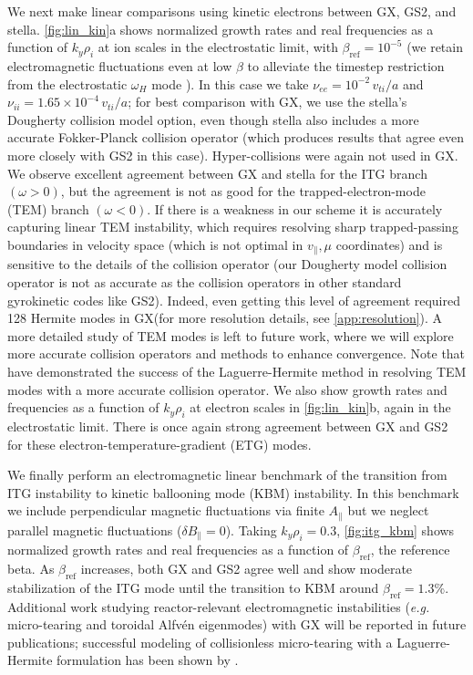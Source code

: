 \documentclass{jpp}
\newcommand{\GX}{{GX}\xspace}
\begin{document}
We next make linear comparisons using kinetic electrons between \GX, GS2, and stella. \cref{fig:lin_kin}a shows normalized growth rates and real frequencies as a function of $k_y \rho_i$ at ion scales in the electrostatic limit, with $\beta_\mathrm{ref}=10^{-5}$ (we retain electromagnetic fluctuations even at low $\beta$ to alleviate the timestep restriction from the electrostatic $\omega_H$ mode \citep{lee1987}). 
In this case we take $\nu_{ee} = 10^{-2}  \, v_{ti}/a$ and $\nu_{ii} = 1.65\times 10^{-4} \, v_{ti}/a$; for best comparison with \GX, we use the stella's Dougherty collision model option, even though stella also includes a more accurate Fokker-Planck collision operator (which produces results that agree even more closely with GS2 in this case). Hyper-collisions were again not used in \GX. We observe excellent agreement between \GX and stella for the ITG branch $(\omega>0)$, but the agreement is not as good for the trapped-electron-mode (TEM) branch $(\omega<0)$. If there is a weakness in our scheme it is accurately capturing linear TEM instability, which requires resolving sharp trapped-passing boundaries in velocity space (which is not optimal in $v_\parallel,\mu$ coordinates) and is sensitive to the details of the collision operator (our Dougherty model collision operator is not as accurate as the collision operators in other standard gyrokinetic codes like GS2). Indeed, even getting this level of agreement required 128 Hermite modes in \GX (for more resolution details, see \cref{app:resolution}). A more detailed study of TEM modes is left to future work, where we will explore more accurate collision operators and methods to enhance convergence. {\color{black} Note that \citet{Frei2021,Frei2022a} have demonstrated the success of the Laguerre-Hermite method in resolving TEM modes with a more accurate collision operator.} We also show growth rates and frequencies as a function of $k_y \rho_i$ at electron scales in \cref{fig:lin_kin}b, again in the electrostatic limit. There is once again strong agreement between \GX and GS2 for these electron-temperature-gradient (ETG) modes.

We finally perform an electromagnetic linear benchmark of the transition from ITG instability to kinetic ballooning mode (KBM) instability.  In this benchmark we include perpendicular magnetic fluctuations via finite $A_\parallel$ but we neglect parallel magnetic fluctuations ($\delta\!B_\parallel=0$). Taking $k_y\rho_i=0.3$, \cref{fig:itg_kbm} shows normalized growth rates and real frequencies as a function of $\beta_\mathrm{ref}$, the reference beta. As $\beta_\mathrm{ref}$ increases, both \GX and GS2 agree well and show  moderate stabilization of the ITG mode until the transition to KBM around $\beta_\mathrm{ref} = 1.3\%$. {\color{black} Additional work studying reactor-relevant electromagnetic instabilities (\emph{e.g.} micro-tearing and toroidal Alfv\'en eigenmodes) with \GX will be reported in future publications; successful modeling of collisionless micro-tearing with a Laguerre-Hermite formulation has been shown by \citet{Frei2023}.}
\end{document}
